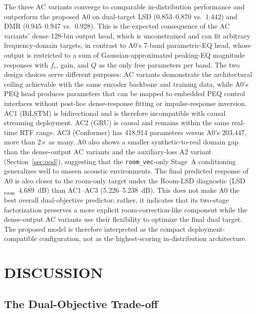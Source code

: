 \documentclass{aes2e}
\begin{document}
The three AC variants converge to comparable in-distribution performance
and outperform the proposed A0 on dual-target LSD (0.853--0.870 vs.\
1.442) and DMR (0.945--0.947 vs.\ 0.928).
This is the expected consequence of the AC variants' dense 128-bin
output head, which is unconstrained and can fit arbitrary
frequency-domain targets, in contrast to A0's 7-band parametric-EQ head, whose output is
restricted to a sum of Gaussian-approximated peaking-EQ magnitude
responses with $f_c$, gain, and $Q$ as the only free parameters per
band.
The two design choices serve different purposes: AC variants
demonstrate the architectural ceiling achievable with the same encoder
backbone and training data, while A0's PEQ head produces parameters that can be mapped to embedded
PEQ control interfaces without post-hoc dense-response fitting or
impulse-response inversion.
AC1 (BiLSTM) is bidirectional and is therefore incompatible with
causal streaming deployment.
AC2 (GRU) is causal and remains within the same real-time RTF range.
AC3 (Conformer) has 418{,}914 parameters versus A0's 203{,}447, more
than 2$\times$ as many.
A0 also shows a smaller synthetic-to-real domain gap than the dense-output
AC variants and the auxiliary-loss A2 variant (Section~\ref{sec:ood}),
suggesting that the \texttt{room\_vec}-only Stage~A conditioning
generalizes well to unseen acoustic environments.
The final predicted response of A0 is also closer to the room-only target
under the Room-LSD diagnostic (LSD$_\text{room}$~4.689~dB) than
AC1--AC3 (5.226--5.238~dB). This does not make A0 the best overall
dual-objective predictor; rather, it indicates that its two-stage
factorization preserves a more explicit room-correction-like component
while the dense-output AC variants use their flexibility to optimize the
final dual target.
The proposed model is therefore interpreted as the compact
deployment-compatible configuration, not as the highest-scoring
in-distribution architecture.

\section{DISCUSSION}

\subsection{The Dual-Objective Trade-off}
\end{document}
